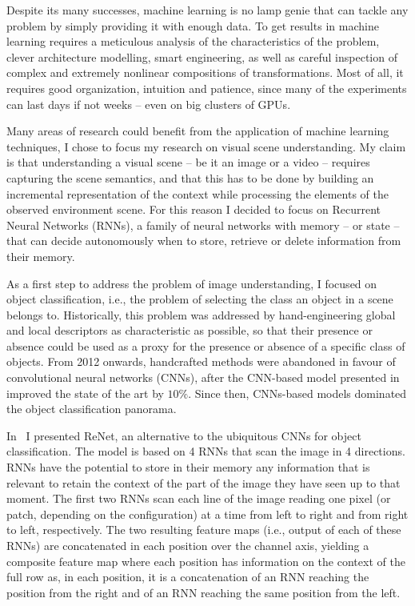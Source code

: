Despite its many successes, machine learning is no lamp genie that can tackle
any problem by simply providing it with enough data. To get results in machine
learning requires a meticulous analysis of the characteristics of the problem,
clever architecture modelling, smart engineering, as well as careful inspection
of complex and extremely nonlinear compositions of transformations. Most of
all, it requires good organization, intuition and patience, since many of the
experiments can last days if not weeks -- even on big clusters of GPUs.

Many areas of research could benefit from the application of machine learning
techniques, I chose to focus my research on visual scene understanding. My
claim is that understanding a visual scene -- be it an image or a video --
requires capturing the scene semantics, and that this has to be done by
building an incremental representation of the context while processing the
elements of the observed environment scene. For this reason I decided to focus
on Recurrent Neural Networks (RNNs), a family of neural networks with memory --
or state -- that can decide autonomously when to store, retrieve or delete
information from their memory.

As a first step to address the problem of image understanding, I focused on
object classification, i.e., the problem of selecting the class an object in a
scene belongs to. Historically, this problem was addressed by hand-engineering
global and local descriptors as characteristic as possible, so that their
presence or absence could be used as a proxy for the presence or absence of a
specific class of objects. From 2012 onwards, handcrafted methods were
abandoned in favour of convolutional neural networks (CNNs), after the
CNN-based model presented in~\citep{Krizhevsky-2012} improved the state of the
art by $10\%$. Since then, CNNs-based models dominated the object
classification panorama.

In~\citep{visin2015renet} I presented ReNet, an alternative to the ubiquitous
CNNs for object classification. The model is based on 4 RNNs that scan the
image in 4 directions. RNNs have the potential to store in their memory any
information that is relevant to retain the context of the part of the image
they have seen up to that moment. The first two RNNs scan each line of the
image reading one pixel (or patch, depending on the configuration) at a time
from left to right and from right to left, respectively. The two resulting
feature maps (i.e., output of each of these RNNs) are concatenated in each
position over the channel axis, yielding a composite feature map where each
position has information on the context of the full row as, in each position,
it is a concatenation of an RNN reaching the position from the right and of an
RNN reaching the same position from the left.

